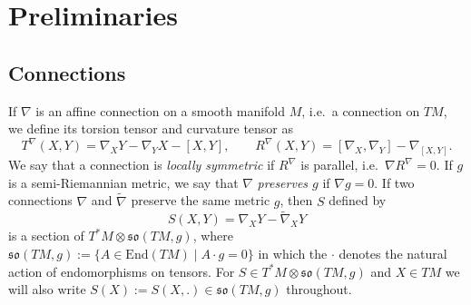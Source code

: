 \documentclass[11pt,a4paper]{amsart}
\newcommand{\tnab}{\widetilde{\nabla}}
\newcommand{\+}{\oplus}
\newcommand{\so}{\mathfrak{so}}
\newcommand{\1}{\mathbf{1}}
\newcommand{\End}{\mathrm{End}}
\newcommand{\<}{\langle}
\renewcommand{\>}{\rangle}
\theoremstyle{definition}
\theoremstyle{plain}
\numberwithin{equation}{section}
\begin{document}
\section{Preliminaries}
\subsection{Connections} 
If $\nabla$ is an affine connection on a smooth manifold $M$, i.e.~a connection on $TM$, we define its torsion tensor and curvature tensor as  
\[T^\nabla(X,Y) =\nabla_XY-\nabla_YX-[X,Y],\qquad R^\nabla(X,Y)=[\nabla_X,\nabla_Y]-\nabla_{[X,Y]}.\]
We say that a connection is {\em locally symmetric} if $R^\nabla $ is parallel, i.e.~$\nabla R^\nabla=0$. If $g$ is a semi-Riemannian metric, we say that $\nabla$  {\em preserves $g$} if $\nabla g=0$. If two connections $\nabla$ and $\tnab$ preserve the same metric $g$, then $S$ defined by \begin{equation}\label{Sdef}
S(X,Y)=\nabla_XY-\tnab_XY
\end{equation}
 is a section of $T^*M\otimes \so(TM,g)$, where $\so(TM,g):=\{A\in \End(TM)\mid A\cdot g=0\}$ in which the $\cdot$ denotes the natural action of  endomorphisms on tensors. For $S\in T^*M\otimes \so(TM,g)$ and $X\in TM$ we will also write $S(X):=S(X,.)\in \so(TM,g)$ throughout.
\end{document}
